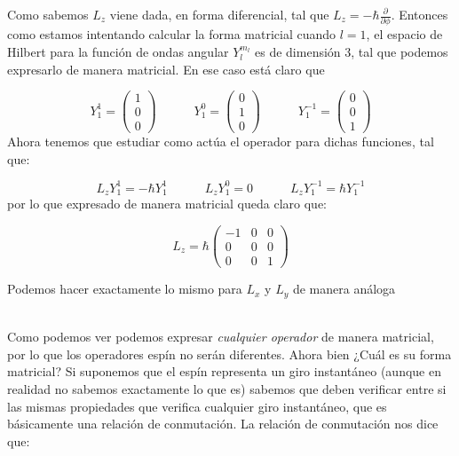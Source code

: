 \documentclass[12pt]{article}
\newcommand{\parciales}[2]{\frac{\partial #1}{\partial #2}}
\newcommand{\tquad}{\quad \quad \quad}
\begin{document}

\hrulefill

Como sabemos $L_z$ viene dada, en forma diferencial, tal que $L_z = - \hbar \parciales{}{\phi}$. Entonces como estamos intentando calcular la forma matricial cuando $l=1$, el espacio de Hilbert para la función de ondas angular $Y_l^{m_l}$ es de dimensión 3, tal que podemos expresarlo de manera matricial. En ese caso está claro que

\begin{equation}
Y_1^1 = \begin{pmatrix}
1 \\ 0 \\ 0
\end{pmatrix}
\tquad Y_1^0 = \begin{pmatrix}
0 \\ 1 \\ 0
\end{pmatrix}
\tquad Y_1^{-1} = \begin{pmatrix}
0 \\ 0 \\ 1
\end{pmatrix} 
\end{equation}
Ahora tenemos que estudiar como actúa el operador para dichas funciones, tal que:

$$L_z Y_1^1 =  - \hbar Y_1^1 \tquad L_z Y_1^0 = 0 \tquad L_z Y_1^{-1} = \hbar Y_1^{-1}$$
por lo que expresado de manera matricial queda claro que:

\begin{equation}
L_z = \hbar \begin{pmatrix}
-1 & 0 & 0 \\
0 & 0 & 0 \\
0 & 0 & 1
\end{pmatrix}
\end{equation}

Podemos hacer exactamente lo mismo para $L_x$ y $L_y$ de manera análoga

\hrulefill \\

Como podemos ver podemos expresar \textit{cualquier operador} de manera matricial, por lo que los operadores espín no serán diferentes. Ahora bien ¿Cuál es su forma matricial? Si suponemos que el espín representa un giro instantáneo (aunque en realidad no sabemos exactamente lo que es) sabemos que deben verificar entre si las mismas propiedades que verifica cualquier giro instantáneo, que es básicamente una relación de conmutación. La relación de conmutación nos dice que:
\end{document}
